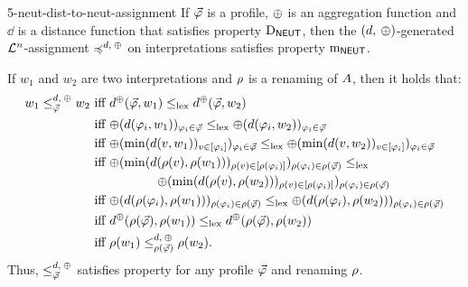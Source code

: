 \begin{prp}{}{5-neut-dist-to-neut-assignment}
	If $\P$ is a profile,
	$\agg$ is an aggregation function
	and $\dd$ is a distance function that satisfies property $\ood{\NEUT}$,
	then 
	the $(\dd,\:\agg)$-generated $\L^n$-assignment $\as^{\dd,\:\agg}$ on interpretations 
	satisfies property $\oom{\NEUT}$.
\end{prp}
\begin{prf*}{}{}%
	If $w_1$ and $w_2$ are two interpretations and $\rnm$ is a renaming of $\Atoms$,
	then it holds that:
	\begin{align*}
		w_1\le^{\dd,\:\agg}_{\P}w_2 &~\text{iff}~\dd^{\agg}(\P,w_1)\le_{\lex}\dd^{\agg}(\P,w_2)\\
				&~\text{iff}~\agg(\dd(\phi_i,w_1))_{\phi_i\in\P}\le_{\lex}\agg(\dd(\phi_i,w_2))_{\phi_i\in\P}\\
				&~\text{iff}~\agg(\min(\dd(v,w_1))_{v\in[\phi_i]})_{\phi_i\in\P}\le_{\lex}\agg(\min(\dd(v,w_2))_{v\in[\phi_i]})_{\phi_i\in\P}\\
				&~\text{iff}~\agg(\min(\dd(\rnm(v),\rnm(w_1)))_{\rnm(v)\in[\rnm(\phi_i)]})_{\rnm(\phi_i)\in\rnm(\P)}\le_{\lex}\\
				&~~~~~~~~~~~~~~~~\agg(\min(\dd(\rnm(v),\rnm(w_2)))_{\rnm(v)\in[\rnm(\phi_i)]})_{\rnm(\phi_i)\in\rnm(\P)}\\
				&~\text{iff}~\agg(\dd(\rnm(\phi_i),\rnm(w_1)))_{\rnm(\phi_i)\in\rnm(\P)}\le_{\lex}\agg(\dd(\rnm(\phi_i),\rnm(w_2)))_{\rnm(\phi_i)\in\rnm(\P)}\\
				&~\text{iff}~\dd^{\agg}(\rnm(\P),\rnm(w_1))\le_{\lex}\dd^{\agg}(\rnm(\P),\rnm(w_2))\\
				&~\text{iff}~\rnm(w_1)\le^{\dd,\:\agg}_{\rnm(\P)}\rnm(w_2).
	\end{align*}	
	Thus, $\le_{\P}^{\dd,\:\agg}$ satisfies property for any profile $\P$ and renaming $\rnm$.
\end{prf*}


	

